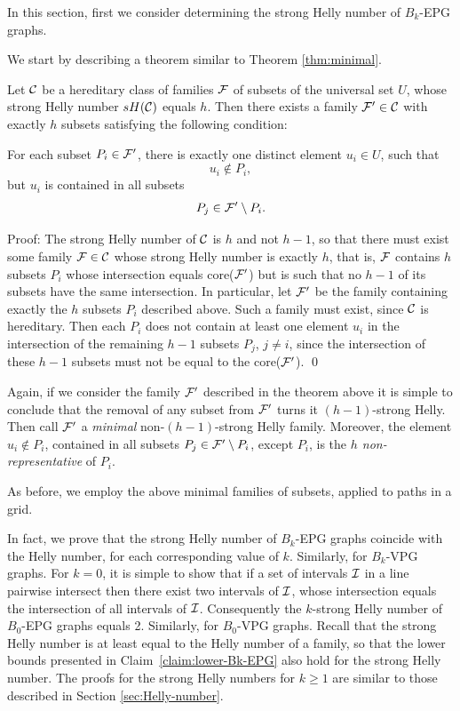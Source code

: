 In this section, first  we consider determining the strong Helly number of $B_k$-EPG graphs.

We start by describing a theorem similar to Theorem \ref{thm:minimal}.

\begin{theorem}\label{thm:minimal-strong}

Let ${\cal C}$ be a hereditary class of families $\cal F$ of subsets of the universal set $U$, whose strong Helly number $sH({\cal C})$ equals $h$. Then there exists a family ${\cal F'} \in {\cal C}$ with exactly $h$ subsets satisfying the following condition: 

For each subset $P_i \in \cal {F'}$, there is exactly one distinct element $u_i \in U$, such that \\
$$u_i \not \in P_i,$$ 
but $u_i$ is contained in all  subsets 
$$P_j \in {\cal F'} \setminus P_i.$$
\end{theorem}

Proof: The strong Helly number of ${\cal C}$ is $h$ and not $h - 1$, so that  there must exist some family ${\cal F} \in {\cal C}$ whose strong Helly number is exactly $h$, that is, $\cal F$  contains $h$ subsets $P_i$ whose intersection equals  core($\cal F'$) but is such that no  $h-1$ of its subsets have the same intersection. In particular, let $\cal F'$ be the family containing exactly the $h$ subsets $P_i$ described above. Such a family must exist, since $\cal C$ is hereditary. Then each $P_i$ does not contain at least one element $u_i$ in the intersection of the remaining $h-1$ subsets $P_j$, $j \ne i$, 
since the intersection of these $h-1$ subsets must not be equal to the core($\cal F'$).  \qed

Again, if we consider the family $\cal F'$ described in the theorem above it is simple to conclude that the removal of any subset from $\cal {F'}$ turns it $(h-1)$-strong Helly.  Then call $\cal {F'}$ a {\it minimal} non-$(h-1)$-strong Helly family. Moreover, the element $u_i \not \in P_i$, contained in all subsets $P_j \in {\cal{F'}} \setminus P_i$, except $P_i$, is the {\it $h$ non-representative} of $P_i$.  

As before, we  employ the above minimal families of subsets, applied to paths in a grid.

In fact, we prove that the strong Helly number of $B_k$-EPG graphs coincide with the Helly number, for each corresponding value of $k$. Similarly, for $B_k$-VPG graphs. For $k=0$, it is simple to show that if a set of intervals $\cal I$ in a line pairwise intersect then there exist two intervals of $\cal I$, whose intersection equals the intersection of all intervals of $\cal I$. Consequently the $k$-strong Helly number of $B_0$-EPG graphs equals 2. 
Similarly, for $B_0$-VPG graphs. 
Recall that the strong Helly number is at least equal to the Helly number of a family, so that the lower bounds presented in Claim~\ref{claim:lower-Bk-EPG} also hold for the strong Helly number. The proofs for the strong Helly numbers for $k \geq 1$ are similar to those described in Section \ref{sec:Helly-number}.  



